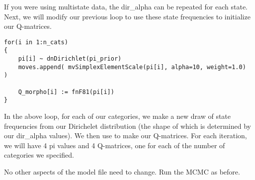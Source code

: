 If you were using multistate data, the dir\_alpha can be repeated for each state.
Next, we will modify our previous loop to use these state frequencies to initialize our Q-matrices.

{\tt \begin{snugshade*}
\begin{lstlisting}for(i in 1:n_cats)
{
	pi[i] ~ dnDirichlet(pi_prior)
    moves.append( mvSimplexElementScale(pi[i], alpha=10, weight=1.0)  )
    
    Q_morpho[i] := fnF81(pi[i])
}
\end{lstlisting}
\end{snugshade*}}

In the above loop, for each of our categories, we make a new draw of state frequencies from our Dirichelet distribution (the shape of which is determined by our dir\_alpha values).  
We then use  to make our Q-matrices.
For each  iteration, we will have 4 pi values and 4 Q-matrices, one for each of the number of categories we specified. \par

No other aspects of the model file need to change.
Run the MCMC as before. \par
